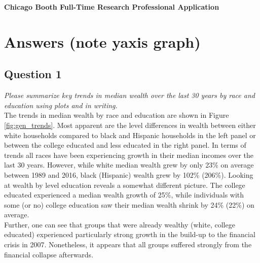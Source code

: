 \documentclass[]{scrartcl}
\begin{document}
\begin{center}
	{\bfseries \Large Chicago Booth Full-Time Research Professional Application}
\end{center}

\section*{Answers (note yaxis graph)}

\subsection*{Question 1}
\textit{Please summarize key trends in median wealth over the last 30 years by race and education using plots
	and in writing.} \\ 

The trends in median wealth by race and education are shown in Figure \ref{fig:gen_trends}. Most apparent are the level differences in wealth between either white households compared to black and Hispanic households in the left panel or between the college educated and less educated in the right panel. In terms of trends all races have been experiencing growth in their median incomes over the last 30 years. However, while white median wealth grew by only 23\% on average between 1989 and 2016, black (Hispanic) wealth grew by 102\% (206\%). Looking at wealth by level education reveals a somewhat different picture. The college educated experienced a median wealth growth of 25\%, while individuals with some (or no) college education saw their median wealth shrink by 24\% (22\%) on average. \\
Further, one can see that groups that were already wealthy (white, college educated) experienced particularly strong growth in the build-up to the financial crisis in 2007. Nonetheless, it appears that all groups suffered strongly from the financial collapse afterwards.
\end{document}
